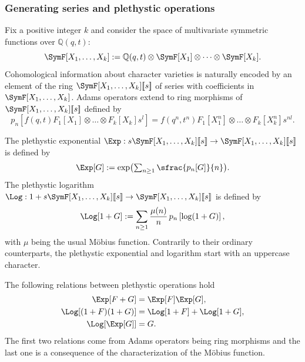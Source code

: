 \subsubsection{Generating series and plethystic operations}
Fix a positive integer $k$ and consider the space of multivariate symmetric functions over $\mathbb{Q}(q,t)$:
\[
\SymF[X_1,\dots,X_k]:=\mathbb{Q}(q,t)\otimes \SymF[X_1]\otimes\dots\otimes \SymF[X_k].
\]
Cohomological information about character varieties is naturally encoded by an ele\-ment of the ring $\SymF[X_1,\dots,X_k][\![s]\!]$ of series with coefficients in $\SymF[X_1,\dots,X_k]$. Adams operators extend to ring morphisms of $\SymF[X_1,\dots,X_k][\![s]\!]$ defined by
\[
p_n\left[f(q,t)F_1\left[X_1\right]\otimes\dots\otimes F_k\left[X_k\right]s^l\right]=f(q^n,t^n)F_1\left[X_1^n\right]\otimes\dots\otimes F_k\left[X_k^n\right]s^{n l}.
\]
\begin{definition}
The plethystic exponential $\Exp : s \SymF [X_1,\dots,X_k][\![s]\!] \to \SymF [X_1,\dots,X_k][\![s]\!]$ is defined by
\[\textstyle
\Exp [G] := \exp\bigl(\sum_{n\ge 1} \sfrac{p_n[G]}{n} \bigr).
\]
The plethystic logarithm $\Log : 1+ s \SymF [X_1,\dots,X_k][\![s]\!] \to \SymF [X_1,\dots,X_k][\![s]\!]$ is defined by
\[
\Log[1+G]:=\sum_{n\ge 1}\frac{\mu(n)}{n}\,p_n \left[\log(1+G)\right],
\]
with $\mu$ being the usual Möbius function. Contrarily to their ordinary counterparts, the plethystic exponential and logarithm start with an uppercase character.
\end{definition}

\begin{remark}
The following relations between plethystic operations hold
\begin{align*}
\Exp[F+G]&=\Exp[F]\Exp[G],\\
\Log[(1+F)(1+G)]&=\Log[1+F]+\Log[1+G], \\
\Log[\Exp[G]] &=G.
\end{align*}
The first two relations come from Adams operators being ring morphisms and the last one is a consequence of the characterization of the Möbius function.
\end{remark}


